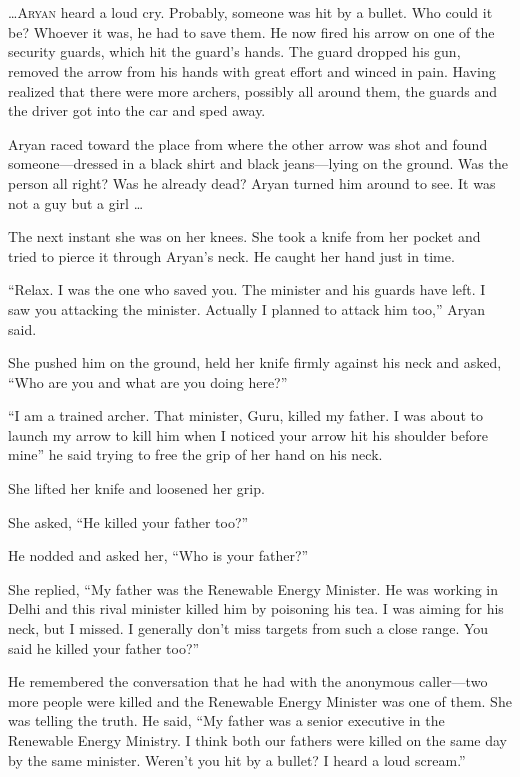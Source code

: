 \chapter{}

\lettrine{…}{Aryan} heard a loud cry. Probably, someone was hit by a bullet. Who could it
be? Whoever it was, he had to save them. He now fired his arrow on one of the
security guards, which hit the guard's hands. The guard dropped his gun, removed
the arrow from his hands with great effort and winced in pain. Having realized
that there were more archers, possibly all around them, the guards and the
driver got into the car and sped away.

Aryan raced toward the place from where the other arrow was shot and found
someone—dressed in a black shirt and black jeans—lying on the ground. Was
the person all right? Was he already dead? Aryan turned him around to see. It
was not a guy but a girl …

The next instant she was on her knees. She took a knife from her pocket and
tried to pierce it through Aryan's neck. He caught her hand just in time.

“Relax. I was the one who saved you. The minister and his guards have left. I
saw you attacking the minister. Actually I planned to attack him too,” Aryan
said.

She pushed him on the ground, held her knife firmly against his neck and asked,
“Who are you and what are you doing here?”

“I am a trained archer. That minister, Guru, killed my father. I was about to
launch my arrow to kill him when I noticed your arrow hit his shoulder before
mine” he said trying to free the grip of her hand on his neck.

She lifted her knife and loosened her grip.

She asked, “He killed your father too?”

He nodded and asked her, “Who is your father?”

She replied, “My father was the Renewable Energy Minister. He was working in
Delhi and this rival minister killed him by poisoning his tea. I was aiming for
his neck, but I missed. I generally don't miss targets from such a close range.
You said he killed your father too?”

He remembered the conversation that he had with the anonymous caller—two more people
were killed and the Renewable Energy
Minister was one of them. She was telling the truth. He said, “My father was a
senior executive in the Renewable Energy Ministry. I think both our fathers
were killed on the same day by the same minister. Weren't you hit by a bullet? I
heard a loud scream.”

